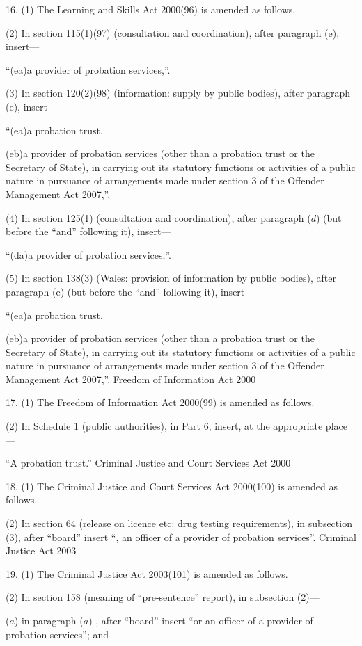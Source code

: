 \documentclass[12pt,a4paper]{article}
\begin{document}
16.  (1)  The Learning and Skills Act 2000(96) is amended as follows.

(2) In section 115(1)(97) (consultation and coordination), after paragraph (e), insert—

“(ea)a provider of probation services,”.

(3) In section 120(2)(98) (information: supply by public bodies), after paragraph (e), insert—

“(ea)a probation trust,

(eb)a provider of probation services (other than a probation trust or the Secretary of State), in carrying out its statutory functions or activities of a public nature in pursuance of arrangements made under section 3 of the Offender Management Act 2007,”.

(4) In section 125(1) (consultation and coordination), after paragraph ($d$)  (but before the “and” following it), insert—

“(da)a provider of probation services,”.

(5) In section 138(3) (Wales: provision of information by public bodies), after paragraph (e) (but before the “and” following it), insert—

“(ea)a probation trust,

(eb)a provider of probation services (other than a probation trust or the Secretary of State), in carrying out its statutory functions or activities of a public nature in pursuance of arrangements made under section 3 of the Offender Management Act 2007,”.
Freedom of Information Act 2000

17.  (1)  The Freedom of Information Act 2000(99) is amended as follows.

(2) In Schedule 1 (public authorities), in Part 6, insert, at the appropriate place—

“A probation trust.”
Criminal Justice and Court Services Act 2000

18.  (1)  The Criminal Justice and Court Services Act 2000(100) is amended as follows.

(2) In section 64 (release on licence etc: drug testing requirements), in subsection (3), after “board” insert “, an officer of a provider of probation services”.
Criminal Justice Act 2003

19.  (1)  The Criminal Justice Act 2003(101) is amended as follows.

(2) In section 158 (meaning of “pre-sentence” report), in subsection (2)—

($a$) in paragraph ($a$) , after “board” insert “or an officer of a provider of probation services”; and
\end{document}
